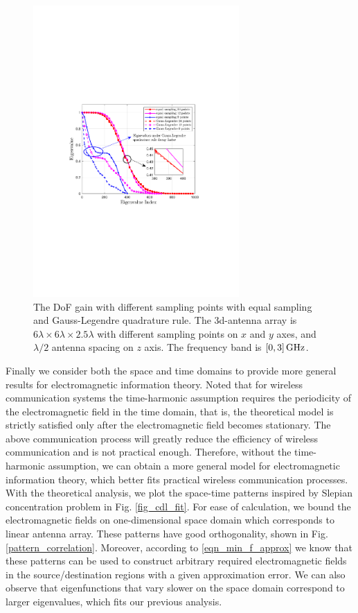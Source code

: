 \documentclass[12pt,draftclsnofoot,journal,onecolumn]{IEEEtran}
\begin{document}
\begin{figure}
	\centering 
	\includegraphics[width=0.7\textwidth]{figs/different_sampling_scheme_merge.pdf} 
	\caption{The DoF gain with different sampling points with equal sampling and Gauss-Legendre quadrature rule. The 3d-antenna array is $6\lambda \times 6\lambda \times 2.5\lambda$ with different sampling points on $x$ and $y$ axes, and $\lambda/2$ antenna spacing on $z$ axis. The frequency band is $[0,3]\,{\rm GHz}$.} 
	\label{different_sampling_scheme_merge}
\end{figure}

Finally we consider both the space and time domains to provide more general results for electromagnetic information theory. Noted that for wireless communication systems the time-harmonic assumption requires the periodicity of the electromagnetic field in the time domain, that is, the theoretical model is strictly satisfied only after the electromagnetic field becomes stationary. The above communication process will greatly reduce the efficiency of wireless communication and is not practical enough. Therefore, without the time-harmonic assumption, we can obtain a more general model for electromagnetic information theory, which better fits practical wireless communication processes. With the theoretical analysis, we plot the space-time patterns inspired by Slepian concentration problem in Fig. \ref{fig_cdl_fit}. For ease of calculation, we bound the electromagnetic fields on one-dimensional space domain which corresponds to linear antenna array. These patterns have good orthogonality, shown in Fig. \ref{pattern_correlation}. Moreover, according to \eqref{eqn_min_f_approx} we know that these patterns can be used to construct arbitrary required electromagnetic fields in the source/destination regions with a given approximation error. {\color{red} We can also observe that eigenfunctions that vary slower on the space domain correspond to larger eigenvalues, which fits our previous analysis.}
\end{document}
